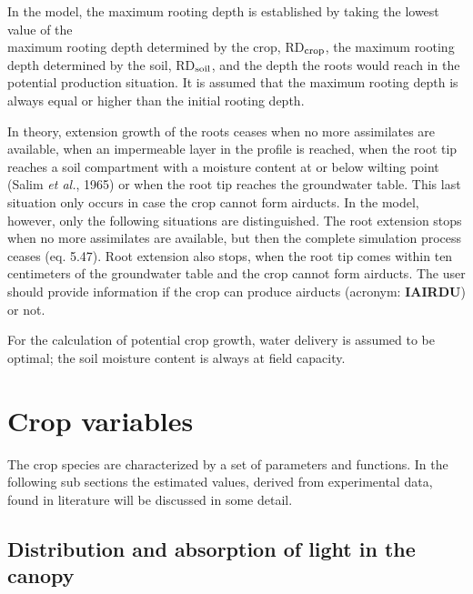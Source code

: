 In the model, the maximum rooting depth is established by taking the lowest value of the\\
maximum rooting depth determined by the crop, RD$_{{\rm crop}}$, the maximum rooting depth
determined by the soil, RD$_{{\rm soil}}$, and the depth the roots would reach in the potential
production situation. It is assumed that the maximum rooting depth is always equal or
higher than the initial rooting depth.


In theory, extension growth of the roots ceases when no more assimilates are available,
when an impermeable layer in the profile is reached, when the root tip reaches a soil
compartment with a moisture content at or below wilting point (Salim {\it et al.\/}, 1965) or
when the root tip reaches the groundwa\-ter table. This last situation only occurs in case
the crop cannot form airducts. In the model, however, only the following situations are
distinguished. The root extension stops when no more assimilates are available, but then
the complete simulation process ceases (eq. 5.47). Root extension also stops, when the
root tip comes within ten centime\-ters of the groundwater table and the crop cannot form
airducts. The user should provide information if the crop can produce airducts (acronym:
{\bf IAIRDU}) or not.


For the calculation of potential crop growth, water delivery is assumed to be optimal; the
soil moisture content is always at field capacity.



\newpage

\section{Crop variables  }

The crop species are characterized by a set of parameters and functions. In the following
sub sections the estimated values, derived from experimental data, found in litera\-ture will
be discussed in some detail.




\subsection{ Distribution and absorption of light in the canopy  } 

